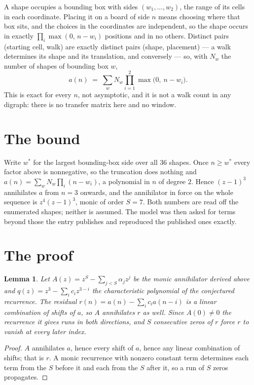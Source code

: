 \documentclass[11pt,a4paper]{article}
\theoremstyle{plain}
\newtheorem{lemma}[theorem]{Lemma}
\theoremstyle{definition}
\begin{document}
A shape occupies a bounding box with sides $(w_1,\dots,w_{2})$, the range of its cells in each
coordinate. Placing it on a board of side $n$ means choosing where that box sits, and the
choices in the coordinates are independent, so the shape occurs in exactly
$\prod_{i}\max(0,\,n-w_i)$ positions and in no others. Distinct pairs (starting cell,
walk) are exactly distinct pairs (shape, placement) --- a walk determines its shape and its
translation, and conversely --- so, with $N_w$ the number of shapes of bounding box $w$,
\[
a(n)\;=\;\sum_{w} N_w \prod_{i=1}^{2}\max\bigl(0,\ n-w_i\bigr).
\]
This is exact for every $n$, not asymptotic, and it is not a walk count in any digraph: there is
no transfer matrix here and no window.

\section{The bound}

Write $w^\ast$ for the largest bounding-box side over all $36$ shapes. Once $n\ge w^\ast$
every factor above is nonnegative, so the truncation does nothing and
$a(n)=\sum_w N_w\prod_i(n-w_i)$, a polynomial in $n$ of degree $2$. Hence $(z-1)^{3}$
annihilates $a$ from $n=3$ onwards, and the annihilator in force on the whole sequence is
$z^{4}(z-1)^{3}$, monic of order $S=7$. Both numbers are read off the enumerated
shapes; neither is assumed. The model was then asked for terms beyond those the entry publishes
and reproduced the published ones exactly.

\section{The proof}

\begin{lemma}\label{lem:crit}
Let $A(z)=z^S-\sum_{j<S}\alpha_jz^{j}$ be the monic annihilator derived above and
$q(z)=z^{3}-\sum_ic_iz^{3-i}$ the characteristic polynomial of the conjectured
recurrence. The residual $r(n)=a(n)-\sum_ic_ia(n-i)$ is a linear combination of shifts of $a$,
so $A$ annihilates $r$ as well. Since $A(0)\ne0$ the recurrence it gives runs in both
directions, and $S$ consecutive zeros of $r$ force $r$ to vanish at every later index.
\end{lemma}

\begin{proof}
$A$ annihilates $a$, hence every shift of $a$, hence any linear combination of shifts; that is
$r$. A monic recurrence with nonzero constant term determines each term from the $S$ before it
and each from the $S$ after it, so a run of $S$ zeros propagates.
\end{proof}
\end{document}
